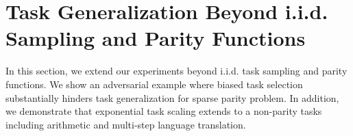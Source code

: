 \section{ Task Generalization Beyond i.i.d. Sampling and Parity Functions
}\label{sec:Discussion}

In this section, we extend our experiments beyond i.i.d. task sampling and parity functions. We show an adversarial example where biased task selection substantially hinders task generalization for sparse parity problem. In addition, we demonstrate that exponential task scaling extends to a non-parity tasks including arithmetic and multi-step language translation.












